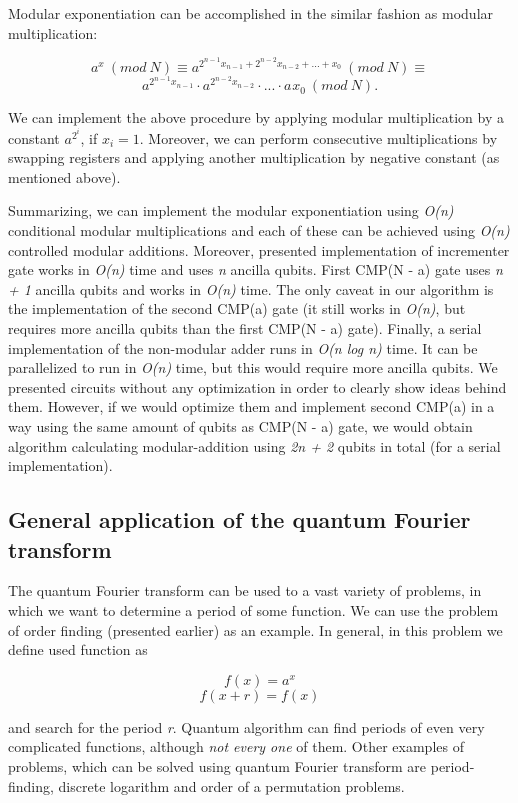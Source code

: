 Modular exponentiation can be accomplished in the similar fashion as modular multiplication:

\[ a^x\ (mod\ N) \equiv a^{2^{n-1}x_{n-1} + 2^{n-2}x_{n-2} + ... + x_0}\ (mod\ N) \equiv \] \[ a^{2^{n-1}x_{n-1}}\cdot a^{2^{n-2}x_{n-2}}\cdot ... \cdot a^{}x_0\ (mod\ N). \]

We can implement the above procedure by applying modular multiplication by a constant $a^{2^i}$, if $x_i = 1$. Moreover, we can perform consecutive multiplications by swapping registers and applying another multiplication by negative constant (as mentioned above).

Summarizing, we can implement the modular exponentiation using \textit{O(n)} conditional modular multiplications and each of these can be achieved using \textit{O(n)} controlled modular additions. Moreover, presented implementation of incrementer gate works in \textit{O(n)} time and uses \textit{n} ancilla qubits. First CMP(N - a) gate uses \textit{n + 1} ancilla qubits and works in \textit{O(n)} time. The only caveat in our algorithm is the implementation of the second CMP(a) gate (it still works in \textit{O(n)}, but requires more ancilla qubits than the first CMP(N - a) gate). Finally, a serial implementation of the non-modular adder runs in \textit{O(n log n)} time. It can be parallelized to run in \textit{O(n)} time, but this would require more ancilla qubits. We presented circuits without any optimization in order to clearly show ideas behind them. However, if we would optimize them and implement second CMP(a) in a way using the same amount of qubits as CMP(N - a) gate, we would obtain algorithm calculating modular-addition using \textit{2n + 2} qubits in total (for a serial implementation).

\subsection{General application of the quantum Fourier transform}

The quantum Fourier transform can be used to a vast variety of problems, in which we want to determine a period of some function. We can use the problem of order finding (presented earlier) as an example. In general, in this problem we define used function as

\[ f(x) = a^x\]
\[ f(x + r) = f(x)\]

and search for the period \textit{r}. Quantum algorithm can find periods of even very complicated functions, although \textit{not every one} of them. Other examples of problems, which can be solved using quantum Fourier transform are period-finding, discrete logarithm and order of a permutation problems.

